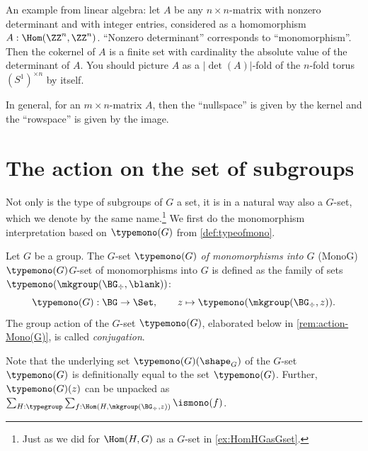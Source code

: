 
\begin{example}
  An example from linear algebra: let $A$ be any $n\times n$-matrix with nonzero determinant and with integer entries, considered as a homomorphism $A:\Hom(\ZZ^n,\ZZ^n)$. ``Nonzero determinant'' corresponds to ``monomorphism''.  Then the cokernel of $A$ is a finite set with cardinality the absolute value of the determinant of $A$.  You should picture $A$ as a $|\det(A)|$-fold \covering of the $n$-fold torus $(S^1)^{\times n}$ by itself.

  In general, for an $m\times n$-matrix $A$, then the ``nullspace'' is given by the kernel and the ``rowspace'' is given by the image.
\end{example}


\section{The action on the set of subgroups}
\label{sec:actiononsub}

Not only is the type of subgroups  of $G$ a set, it is in a natural way also a $G$-set, which we denote by the same name.\footnote{%
Just as we did for $\Hom(H,G)$ as a $G$-set in \cref{ex:HomHGasGset}.}
We first do the monomorphism interpretation based on
$\typemono(G)$ from \cref{def:typeofmono}.
\begin{definition}
Let $G$ be a group. The $G$-set $\typemono(G)$
\emph{of monomorphisms into $G$}
\glossary(MonoG){$\protect\typemono(G)$}{$G$-set of monomorphisms into $G$}
is defined as the family of sets $\typemono(\mkgroup(\BG_\div,\blank))$:
\[\typemono(G):\BG\to\Set,
\qquad z\mapsto \typemono(\mkgroup(\BG_\div,z)).
\]
The group action of the $G$-set $\typemono(G)$, elaborated below in
\cref{rem:action-Mono(G)}, is called \emph{conjugation}.
\end{definition}
Note that the underlying set $\typemono(G)(\sh_G)$ of the $G$-set 
$\typemono(G)$ is definitionally equal to the set $\typemono(G)$.
Further,
$\typemono(G)(z)$ can be unpacked as 
$\sum_{H:\typegroup}\sum_{f:\Hom(H,\mkgroup(\BG_\div,z))}\ismono(f)$.

